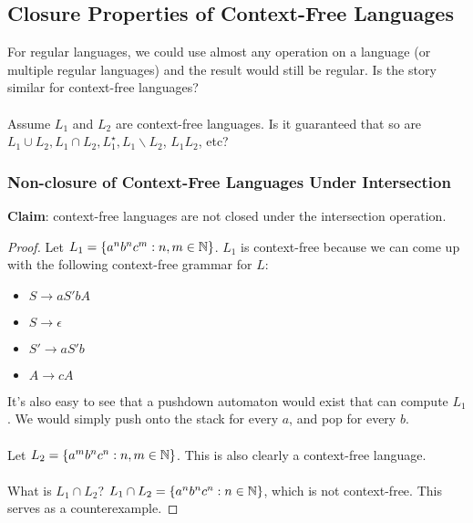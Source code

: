 \documentclass[]{article}
\DeclarePairedDelimiter{\set}{\lbrace}{\rbrace}
\theoremstyle{definition}
\begin{document}
      \subsection{Closure Properties of Context-Free Languages}
        For regular languages, we could use almost any operation on a language (or multiple regular languages) and the result would still be regular. Is the story similar for context-free languages?
        \\ \\
        Assume $L_1$ and $L_2$ are context-free languages. Is it guaranteed that so are $L_1 \cup L_2, L_1 \cap L_2, L_1^\star, L_1 \backslash L_2$, $L_1 L_2$, etc?

        \subsubsection{Non-closure of Context-Free Languages Under Intersection}
          \textbf{Claim}: context-free languages are not closed under the intersection operation.

          \begin{proof}
            Let $L_1 = \set{a^n b^n c^m : n, m \in \mathbb{N}}$. $L_1$ is context-free because we can come up with the following context-free grammar for $L$:
            \begin{itemize}
              \item $S \to aS' bA$
              \item $S \to \epsilon$
              \item $S' \to aS'b$
              \item $A \to cA$
            \end{itemize}

            It's also easy to see that a pushdown automaton would exist that can compute $L_1$. We would simply push onto the stack for every $a$, and pop for every $b$.
            \\ \\
            Let $L_2 = \set{a^m b^n c^n : n, m \in \mathbb{N}}$. This is also clearly a context-free language.
            \\ \\
            What is $L_1 \cap L_2$? $L_1 \cap L_2 = \set{a^n b^n c^n : n \in \mathbb{N}}$, which is not context-free. This serves as a counterexample.
          \end{proof}
\end{document}
